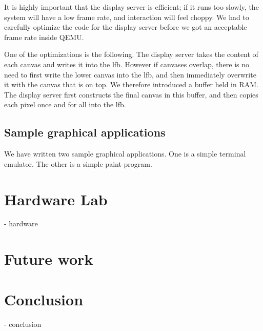 \documentclass{article}
\begin{document}
It is highly important that the display server is efficient; if it runs too
slowly, the system will have a low frame rate, and interaction will feel
choppy. We had to carefully optimize the code for the display server before we
got an acceptable frame rate inside QEMU.

One of the optimizations is the following. The display server takes the
content of each canvas and writes it into the \gls{lfb}. However if
canvases overlap, there is no need to first write the lower canvas into the
\gls{lfb}, and then immediately overwrite it with the canvas that is on top.
We therefore introduced a buffer held in RAM. The display server first
constructs the final canvas in this buffer, and then copies each pixel once
and for all into the \gls{lfb}.



\subsection{Sample graphical applications}
We have written two sample graphical applications. One is a simple terminal
emulator. The other is a simple paint program.




\section{Hardware Lab}
- hardware


\section{Future work}


\section{Conclusion}
- conclusion
\end{document}
